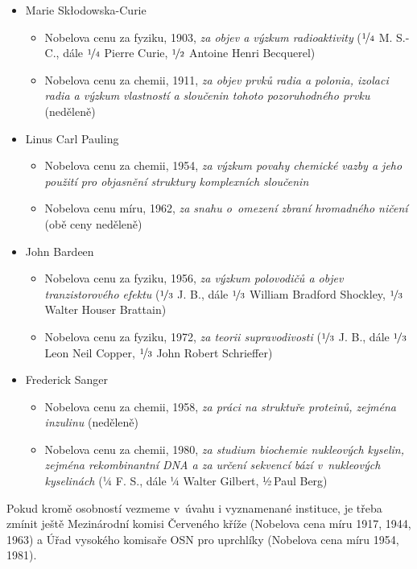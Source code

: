 \documentclass{book}
\begin{document}
\begin{itemize}[topsep=0mm,itemsep=0mm]
\item Marie Skłodowska-Curie 
\begin{itemize}[topsep=0mm,itemsep=0mm]
\item Nobelova cenu za fyziku, 1903, \textit{za objev a výzkum radioaktivity} ($\nicefrac{1}{4}$
M. S.-C., dále $\nicefrac{1}{4}$ Pierre Curie, $\nicefrac{1}{2}$
Antoine Henri Becquerel)
\item Nobelova cenu za chemii, 1911, \textit{za objev prvků radia a polonia, izolaci
radia a výzkum vlastností a sloučenin tohoto pozoruhodného prvku} (neděleně)
\end{itemize}
\item Linus Carl Pauling 
\begin{itemize}
\item Nobelova cenu za chemii, 1954, \textit{za výzkum povahy chemické vazby a jeho
použití pro objasnění struktury komplexních sloučenin}
\item Nobelova cenu míru, 1962, \textit{za snahu o~omezení zbraní hromadného ničení}
(obě ceny neděleně)
\end{itemize}
\item John Bardeen 
\begin{itemize}
\item Nobelova cenu za fyziku, 1956, \textit{za výzkum polovodičů a objev tranzistorového
efektu} ($\nicefrac{1}{3}$ J. B., dále $\nicefrac{1}{3}$ William
Bradford Shockley, $\nicefrac{1}{3}$\,Walter Houser Brattain) 
\item Nobelova cenu za fyziku, 1972, \textit{za teorii supravodivosti} ($\nicefrac{1}{3}$
J. B., dále $\nicefrac{1}{3}$ Leon Neil Copper, $\nicefrac{1}{3}$
John Robert Schrieffer)
\end{itemize}
\item Frederick Sanger 
\begin{itemize}
\item Nobelova cenu za chemii, 1958, \textit{za práci na struktuře proteinů, zejména
inzulinu} (neděleně)
\item Nobelova cenu za chemii, 1980, \textit{za studium biochemie nukleových kyselin,
zejména rekombinantní DNA a za určení sekvencí bází v~nukleových kyselinách}
(¼ F. S., dále ¼ Walter Gilbert, ½\,Paul Berg)
\end{itemize}
\end{itemize}
Pokud kromě osobností vezmeme v~úvahu i vyznamenané instituce, je
třeba zmínit ještě Mezinárodní komisi Červeného kříže (Nobelova cena
míru 1917, 1944, 1963) a Úřad vysokého komisaře OSN pro uprchlíky
(Nobelova cena míru 1954, 1981).
\end{document}
